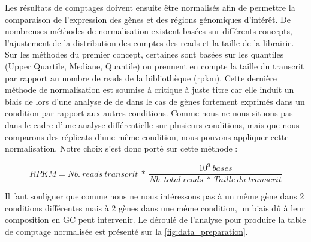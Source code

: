 \documentclass[12pt,a4paper]{report}
\begin{document}
\begin{onehalfspace}
Les résultats de comptages doivent ensuite être normalisés afin de permettre la comparaison de l'expression des gènes et des régions génomiques d'intérêt. De nombreuses méthodes de normalisation existent basées sur différents concepts, l'ajustement de la distribution des comptes des reads et la taille de la librairie. Sur les méthodes du premier concept, certaines sont basées sur les quantiles (Upper Quartile, Mediane, Quantile) ou prennent en compte la taille du transcrit par rapport au nombre de reads de la bibliothèque (\gls{rpkm}). Cette dernière méthode de normalisation est soumise à critique à juste titre \citep{Dillies2013} car elle induit un biais de lors d'une analyse de \gls{de} dans le cas de gènes fortement exprimés dans un condition par rapport aux autres conditions. Comme nous ne nous situons pas dans le cadre d'une analyse différentielle sur plusieurs conditions, mais que nous comparons des réplicats d'une même condition, nous pouvons appliquer cette normalisation. Notre choix s'est donc porté sur cette méthode \citep{Mortazavi2008} :

\[RPKM = Nb.~reads~transcrit~*~\frac{10^9~bases}{Nb.~total~reads~*~Taille~du~transcrit}\]

Il faut souligner que comme nous ne nous intéressons pas à un même gène dans 2 conditions différentes mais à 2 gènes dans une même condition, un biais dû à leur composition en GC peut intervenir. Le déroulé de l'analyse pour produire la table de comptage normalisée est présenté sur la \autoref{fig:data_preparation}.


\end{onehalfspace}
\end{document}
